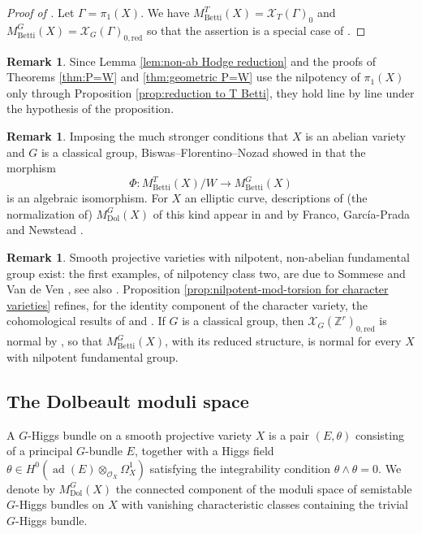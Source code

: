 \documentclass[11pt, a4paper]{amsart}
\theoremstyle{definition}
\newtheorem{remark}[theorem]{Remark}
\theoremstyle{myitemstyle}
\newcommand{\Z}{\mathbb{Z}}
\newcommand{\red}{{\mathrm{red}}}
\newcommand{\mc}[1]{{\mathcal{#1}}}
\DeclareMathOperator{\ad}{ad}
\newcommand{\Dol}{{\mathrm{Dol}}}
\newcommand{\Betti}{{\mathrm{Betti}}}
\begin{document}
\begin{proof}[Proof of ]
  Let $\Gamma=\pi_1(X)$. We have $M^T_\Betti(X)=\mc X_T(\Gamma)_{0}$ and $M^G_\Betti(X)=\mc X_G(\Gamma)_{0,\red}$ so that the assertion is a special case of .
\end{proof}


\begin{remark}\label{rem: nilpotent mod torsion}
Since Lemma \ref{lem:non-ab Hodge reduction} and the proofs of Theorems \ref{thm:P=W} and \ref{thm:geometric P=W} use the nilpotency of $\pi_1(X)$ only through Proposition \ref{prop:reduction to T Betti}, they hold line by line under the hypothesis of the proposition.
\end{remark}

\begin{remark}
    Imposing the much stronger conditions that $X$ is an abelian variety and $G$ is a classical group, Biswas--Florentino--Nozad  showed in \cite[Theorem 4]{BFN24} that  the morphism
    \[
    \Phi\colon M^{T}_\Betti(X)/W \to M^G_\Betti(X)
    \]
    is an algebraic isomorphism. 
    For $X$ an elliptic curve, descriptions of (the normalization of) $M^G_\Dol(X)$ of this kind appear in \cite{Thaddeus} and by Franco, Garc\'ia-Prada and Newstead \cite{FGN14, FGN19}.
\end{remark}

\begin{remark}
\label{rem:nilpotent examples}
Smooth projective varieties with nilpotent, non-abelian fundamental group exist: the first examples, of nilpotency class two, are due to Sommese and Van de Ven \cite{SommeseVandeVen86}, see also \cite{Campana95}. Proposition \ref{prop:nilpotent-mod-torsion for character varieties} refines, for the identity component of the character variety, the cohomological results of \cite[Corollary 1.4]{BergeronSilberman16} and \cite[Theorem 5.9]{FLS25}. If $G$ is a classical group, then $\mc X_G(\Z^r)_{0,\red}$ is normal by \cite{Sikora}, so that $M^G_\Betti(X)$, with its reduced structure, is normal for every $X$ with nilpotent fundamental group.
\end{remark}

\subsection{The Dolbeault moduli space }
\label{sec:preliminaries-dolbeault}
A $G$-Higgs bundle on a smooth projective variety $X$ is a pair $(E,\theta)$ consisting of a principal $G$-bundle $E$, together with a Higgs field $\theta\in H^0(\ad(E)\otimes_{\mc O_X} \Omega^1_X)$ satisfying the integrability condition $\theta\wedge \theta =0$. 
We denote by $M^G_\Dol(X)$ the connected component of the moduli space of semistable $G$-Higgs bundles on $X$ with vanishing characteristic classes  containing the trivial $G$-Higgs bundle.
\end{document}
